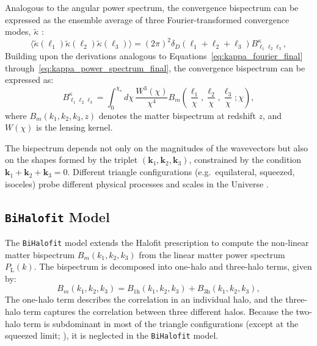 Analogous to the angular power spectrum, the convergence bispectrum can be expressed as the ensemble average of three Fourier-transformed convergence modes, \( \tilde{\kappa} \) \citep{2005PhRvD..72h3001D}:
\begin{equation}
    \langle \tilde{\kappa}(\mathbf{\ell}_1) \tilde{\kappa}(\mathbf{\ell}_2) \tilde{\kappa}(\mathbf{\ell}_3) \rangle = (2\pi)^2 \delta_{D}(\mathbf{\ell}_1 + \mathbf{\ell}_2 + \mathbf{\ell}_3) B^\kappa_{\ell_1 \ell_2 \ell_3},
    \label{eq:convergence_bispectrum_def}
\end{equation}
Building upon the derivations analogous to Equations~\eqref{eq:kappa_fourier_final} through~\eqref{eq:kappa_power_spectrum_final}, the convergence bispectrum can be expressed as:
\begin{equation}
    B_{\ell_1 \ell_2 \ell_3}^\kappa = \int_0^{\chi_s} d\chi \, \frac{W^3(\chi)}{\chi^4} B_m\left( \frac{\ell_1}{\chi}, \frac{\ell_2}{\chi}, \frac{\ell_3}{\chi}; \chi \right),
    \label{eq:convergence_bispectrum}
\end{equation}
where \( B_m(k_1, k_2, k_3, z) \) denotes the matter bispectrum at redshift \( z \), and \( W(\chi) \) is the lensing kernel. 

The bispectrum depends not only on the magnitudes of the wavevectors but also on the shapes formed by the triplet \( (\boldsymbol{k}_1, \boldsymbol{k}_2, \boldsymbol{k}_3) \), constrained by the condition \( \boldsymbol{k}_1 + \boldsymbol{k}_2 + \boldsymbol{k}_3 = 0 \). Different triangle configurations (e.g.\, equilateral, squeezed, isoceles) probe different physical processes and scales in the Universe \citep{2005PhRvD..72h3001D}.

\subsection{\texttt{BiHalofit} Model}
The \texttt{BiHalofit} model \citep{2020ApJ...895..113T} extends the Halofit prescription to compute the non-linear matter bispectrum \( B_m(k_1, k_2, k_3) \) from the linear matter power spectrum \( P_{\mathrm{L}}(k) \). The bispectrum is decomposed into one-halo and three-halo terms, given by:
\begin{equation}
    B_m(k_1, k_2, k_3) = B_{\mathrm{1h}}(k_1, k_2, k_3) + B_{\mathrm{3h}}(k_1, k_2, k_3),
    \label{eq:bihalofit_model}
\end{equation}
The one-halo term describes the correlation in an individual halo, and the three-halo term captures the correlation between three different halos. Because the two-halo term is subdominant in most of the triangle configurations (except at the squeezed limit; \citealt{2011A&A...532A...4V}), it is neglected in the \texttt{BiHalofit} model.

